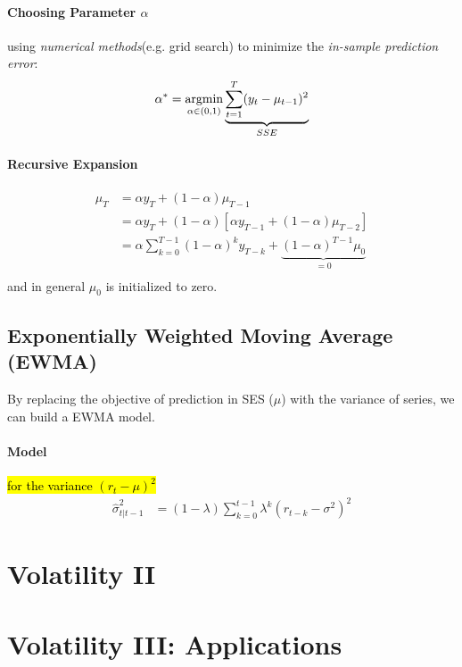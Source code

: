 \documentclass[11pt]{article}
\begin{document}
			\paragraph{Choosing Parameter $\alpha$} using \emph{numerical methods}(e.g. grid search) to minimize the \emph{in-sample prediction error}:
				\begin{gather}
					\alpha^* = \operatorname*{argmin}_{\alpha \in (0, 1)} \underbrace{\sum_{t=1}^T(y_t - \mu_{t-1})^2}_{SSE}
				\end{gather}
			
			\paragraph{Recursive Expansion}
				\begin{align}
					\mu_T &= \alpha y_T + (1 - \alpha) \mu_{T-1} \\
					&= \alpha y_T + (1 - \alpha) [\alpha y_{T-1} + (1 - \alpha) \mu_{T-2}] \\
					&= \alpha \sum_{k=0}^{T-1}(1-\alpha)^k y_{T-k} + \underbrace{(1 - \alpha)^{T-1} \mu_0}_{=0} \\
				\end{align}
				and in general $\mu_0$ is initialized to zero.
		
		\subsection{Exponentially Weighted Moving Average (EWMA)}
			\begin{remark}
				By replacing the objective of prediction in SES ($\mu$) with the variance of series, we can build a EWMA model. 
			\end{remark}
			
			\paragraph{Model} \hl{for the variance $(r_t - \mu)^2$}
				\begin{align}
					\hat{\sigma}^2_{t|t-1} &= (1 - \lambda) \sum_{k=0}^{t-1} \lambda^k (r_{t-k} - \sigma^2)^2 
				\end{align}
				
	
	\section{Volatility II}
	
	\section{Volatility III: Applications}
\end{document}

